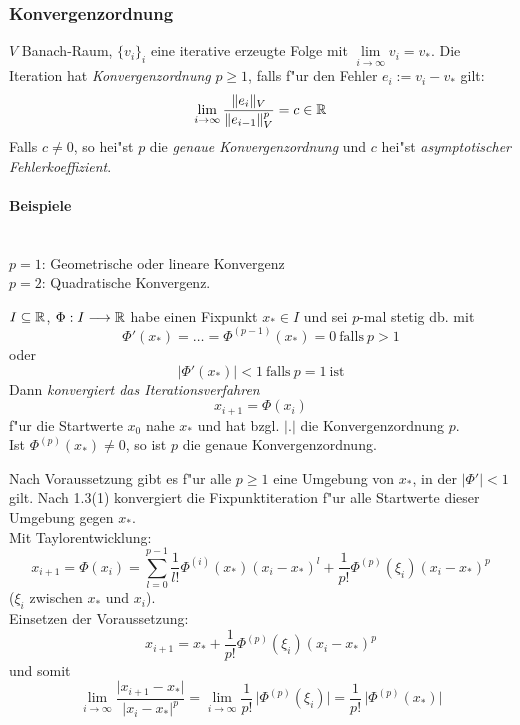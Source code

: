 \documentclass{scrartcl}
\begin{document}
\subsubsection{Konvergenzordnung} 
$V$ Banach-Raum, $\{ v_i \}_i$ eine iterative erzeugte Folge mit $\lim\limits_{i \rightarrow \infty} v_i = v_*$. Die Iteration hat \emph{Konvergenzordnung} $p \geq 1$, falls f"ur den Fehler $e_i := v_i - v_*$ gilt:
$$ \lim\limits_{i \rightarrow \infty} \frac{ \Vert e_i \Vert_V}{ \Vert e_{i-1} \Vert_V ^p} = c \in \mathbb{R}$$
Falls $c \neq 0$, so hei"st $p$ die \emph{genaue Konvergenzordnung} und $c$ hei"st \emph{asymptotischer Fehlerkoeffizient}. \\
\paragraph*{Beispiele} \ \\
$p=1$: Geometrische oder lineare Konvergenz \\
$p=2$: Quadratische Konvergenz.

\begin{Satz}
$I \subseteq \mathbb{R}$, $\Phi: I \longrightarrow \mathbb{R}$ habe einen Fixpunkt $x_* \in I$ und sei $p$-mal stetig db. mit 
$$\Phi'(x_*) = \ldots = \Phi^{(p-1)}(x_*) = 0 \mathrm{\ falls \ } p > 1$$ oder 
$$\vert \Phi'(x_*) \vert < 1 \mathrm{\ falls \ } p=1 \mathrm{\  ist}$$
Dann \emph{konvergiert das Iterationsverfahren} $$x_{i+1} = \Phi(x_i)$$ f"ur die Startwerte $x_0$ nahe $x_*$ und hat bzgl. $\vert . \vert$ die Konvergenzordnung $p$. \\
Ist $\Phi^{(p)}(x_*) \neq 0$, so ist $p$ die genaue Konvergenzordnung.
\end{Satz}
\begin{Bew}
Nach Voraussetzung gibt es f"ur alle $p \geq 1$ eine Umgebung von $x_*$, in der $\vert \Phi' \vert < 1$ gilt. Nach 1.3(1) konvergiert die Fixpunktiteration f"ur alle Startwerte dieser Umgebung gegen $x_*$. \\
Mit Taylorentwicklung:
$$x_{i+1} = \Phi(x_i) = \sum\limits_{l=0}^{p-1} \frac{1}{l!} \Phi^{(i)} (x_*) (x_i - x_*)^l + \frac{1}{p!} \Phi^{(p)} (\xi_i) (x_i - x_*) ^p$$
($\xi_i$ zwischen $x_*$ und $x_i$). \\
Einsetzen der Voraussetzung:
$$x_{i+1} = x_* + \frac{1}{p!} \Phi^{(p)} (\xi_i) (x_i - x_*)^p$$
und somit
$$\lim\limits_{i \rightarrow \infty} \frac{ \vert x_{i+1} - x_* \vert}{ \vert x_i - x_* \vert^p} = \lim\limits_{i \rightarrow \infty} \frac{1}{p!} \, \vert \Phi^{(p)} (\xi_i) \vert = \frac{1}{p!} \, \vert \Phi^{(p)} (x_*) \vert$$
\end{Bew}
\end{document}
